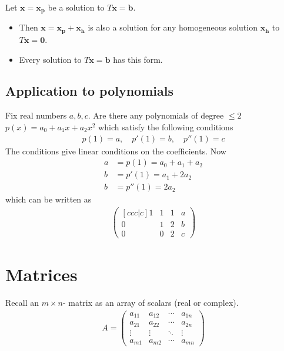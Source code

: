 \documentclass{report}
\renewcommand{\vec}{\mathbf}
\begin{document}
		Let $\vec{x} = \vec{x_p}$ be a solution to $T\vec{x} = \vec{b}$.
		\begin{itemize}
			\item Then $\vec{x} = \vec{x_p} + \vec{x_h}$ is also a solution for any homogeneous solution $\vec{x_h}$ to $T\vec{x} = \vec{0}$.
			\item Every solution to $T\vec{x} = \vec{b}$ has this form.
		\end{itemize}

	\section{Application to polynomials}

		Fix real numbers $a,b,c$. Are there any polynomials of degree $\leq 2$ $p(x) = a_0 + a_1x + a_2x^2$ which satisfy the following conditions
		\begin{align*}
			p(1) = a, \quad p'(1) = b, \quad p''(1) = c
		\end{align*}
		The conditions give linear conditions on the coefficients. Now
		\begin{align*}
			a &= p(1) = a_0 + a_1 + a_2	\\
			b &= p'(1) = a_1 + 2a_2		\\
			b &= p''(1) = 2a_2
		\end{align*}
		which can be written as 
		\begin{align*}
			\begin{pmatrix}[ccc|c]
				1 & 1 & 1 & a	\\
				0 & 1 & 2 & b	\\
				0 & 0 & 2 & c
			\end{pmatrix}
		\end{align*}

\chapter{Matrices}

	Recall an $m \times n$- matrix as an array of scalars (real or complex).
	\begin{align*}
		A = \begin{pmatrix}
			a_{11} & a_{12} & \cdots & a_{1n}	\\
			a_{21} & a_{22} & \cdots & a_{2n}	\\
			\vdots & \vdots & \ddots & \vdots	\\
			a_{m1} & a_{m2} & \cdots & a_{mn}
		\end{pmatrix}
	\end{align*}
\end{document}
